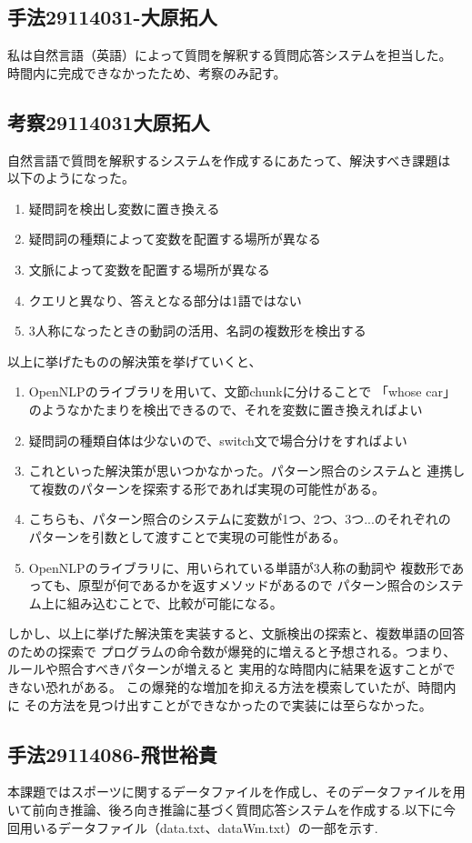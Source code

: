\documentclass{jarticle}
\begin{document}
\subsection{手法29114031-大原拓人}
私は自然言語（英語）によって質問を解釈する質問応答システムを担当した。
時間内に完成できなかったため、考察のみ記す。

\subsection{考察29114031大原拓人}
自然言語で質問を解釈するシステムを作成するにあたって、解決すべき課題は
以下のようになった。
\begin{enumerate}
\item 疑問詞を検出し変数に置き換える
\item 疑問詞の種類によって変数を配置する場所が異なる
\item 文脈によって変数を配置する場所が異なる
\item クエリと異なり、答えとなる部分は1語ではない
\item 3人称になったときの動詞の活用、名詞の複数形を検出する
\end{enumerate}
以上に挙げたものの解決策を挙げていくと、
\begin{enumerate}
\item OpenNLPのライブラリを用いて、文節chunkに分けることで
    「whose car」のようなかたまりを検出できるので、それを変数に置き換えればよい
\item 疑問詞の種類自体は少ないので、switch文で場合分けをすればよい
\item これといった解決策が思いつかなかった。パターン照合のシステムと
    連携して複数のパターンを探索する形であれば実現の可能性がある。
\item こちらも、パターン照合のシステムに変数が1つ、2つ、3つ...のそれぞれの
    パターンを引数として渡すことで実現の可能性がある。
\item OpenNLPのライブラリに、用いられている単語が3人称の動詞や
    複数形であっても、原型が何であるかを返すメソッドがあるので
    パターン照合のシステム上に組み込むことで、比較が可能になる。
\end{enumerate}
しかし、以上に挙げた解決策を実装すると、文脈検出の探索と、複数単語の回答のための探索で
プログラムの命令数が爆発的に増えると予想される。つまり、ルールや照合すべきパターンが増えると
実用的な時間内に結果を返すことができない恐れがある。
この爆発的な増加を抑える方法を模索していたが、時間内に
その方法を見つけ出すことができなかったので実装には至らなかった。
\subsection{手法29114086-飛世裕貴}
本課題ではスポーツに関するデータファイルを作成し、そのデータファイルを用いて前向き推論、後ろ向き推論に基づく質問応答システムを作成する.以下に今回用いるデータファイル（data.txt、dataWm.txt）の一部を示す.\\
\end{document}
